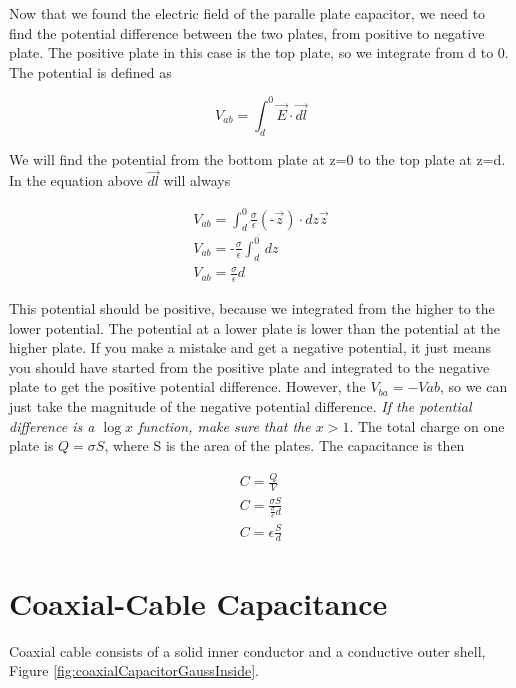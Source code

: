 \documentclass{ximera}
\begin{document}
Now that we found the electric field of the paralle plate capacitor, we need to find the potential difference between the two plates, from positive to negative plate. The positive plate in this case is the top plate, so we integrate from d to 0. The potential is defined as 

\begin{equation}
V_{ab}= \int_d^0 \vec{E} \cdot \vec{dl}
\end{equation}


We will find the potential from the bottom plate at z=0 to the top plate at z=d. In the equation above $\vec{dl}$ will always

\begin{eqnarray}
V_{ab}= \int_d^0   \frac{\sigma}{ \epsilon } (\text{-} \vec{z}) \cdot dz \vec{z} \\
V_{ab}= \text{-} \frac{\sigma}{ \epsilon } \int_d^0     \, dz \\
V_{ab}=\frac{\sigma}{ \epsilon } d
\end{eqnarray}

This potential should be positive, because we integrated from the higher to the lower potential. The potential at a lower plate is lower than the potential at the higher plate. If you make a mistake and get a negative potential, it just means you should have started from the positive plate and integrated to the negative plate to get the positive potential difference. However, the $V_{ba}=-V{ab}$, so we can just take the magnitude of the negative potential difference. {\it If the potential difference is a $\log x$ function, make sure that the $x>1$}. The total charge on one plate is $Q=\sigma S$, where S is the area of the plates. The capacitance is then


\begin{eqnarray}
C=\frac{Q}{V} \\
C=\frac{\sigma S}{\frac{\sigma }{ \epsilon } d } \\
C=\epsilon  \frac{S}{d}
\end{eqnarray}



\section{Coaxial-Cable Capacitance}

Coaxial cable consists of a solid  inner conductor and a conductive outer shell, Figure \ref{fig:coaxialCapacitorGaussInside}.
\end{document}
